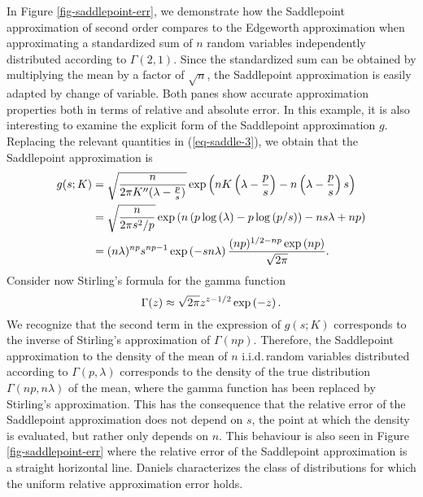 \begin{example}
    In Figure \ref{fig-saddlepoint-err}, we demonstrate how the Saddlepoint approximation of second order compares to the Edgeworth approximation when approximating a standardized sum of $n$ random variables independently distributed according to $\Gamma(2, 1)$. Since the standardized sum can be obtained by multiplying the mean by a factor of $\sqrt{n}$, the Saddlepoint approximation is easily adapted by change of variable. Both panes show accurate approximation properties both in terms of relative and absolute error.
    \newline
    In this example, it is also interesting to examine the explicit form of the Saddlepoint approximation $g$. Replacing the relevant quantities in (\ref{eq-saddle-3}), we obtain that the Saddlepoint approximation is
    \begin{align*}
        g(s; K) &= \sqrt{\frac{n}{2\pi K''(\lambda - \frac{p}{s})}} \exp\left(nK\left(\lambda - \frac{p}{s}\right) - n\left(\lambda - \frac{p}{s}\right)s\right)\\
        &= \sqrt{\frac{n}{2\pi s^2/p}} \exp\left(n\left(p\log\left(\lambda\right) - p\log\left(p/s\right)\right) - ns\lambda + np\right)\\
        &= (n\lambda)^{np}s^{np-1}\exp\left(-sn\lambda\right)  \frac{(np)^{1/2-np}\exp\left(np\right)}{\sqrt{2\pi}}.
    \end{align*}
    Consider now Stirling's formula for the gamma function
    \begin{equation*}
        \Gamma(z) \approx \sqrt{2\pi}z^{z-1/2}\exp\left(-z\right).
    \end{equation*}
    We recognize that the second term in the expression of $g(s; K)$ corresponds to the inverse of Stirling's approximation of $\Gamma(np)$. Therefore, the Saddlepoint approximation to the density of the mean of $n$ i.i.d.\,random variables distributed according to $\Gamma(p, \lambda)$ corresponds to the density of the true distribution $\Gamma(np, n\lambda)$ of the mean, where the gamma function has been replaced by Stirling's approximation. This has the consequence that the relative error of the Saddlepoint approximation does not depend on $s$, the point at which the density is evaluated, but rather only depends on $n$. This behaviour is also seen in Figure \ref{fig-saddlepoint-err} where the relative error of the Saddlepoint approximation is a straight horizontal line. Daniels \cite{daniels1954saddlepoint} characterizes the class of distributions for which the uniform relative approximation error holds.

  
    
\end{example}